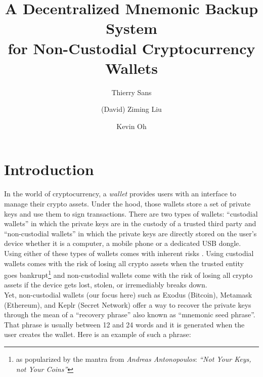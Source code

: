 \documentclass[runningheads]{llncs}
\begin{document}
\title{A Decentralized Mnemonic Backup System\\ for Non-Custodial Cryptocurrency Wallets}

\author{Thierry Sans \and
(David) Ziming Liu\and
Kevin Oh}


\maketitle             

\begin{abstract}



\end{abstract}

\section{Introduction}

In the world of cryptocurrency, a {\em wallet} provides users with an interface to manage their crypto assets. Under the hood, those wallets store a set of private keys and use them to sign transactions. There are two types of wallets: ``custodial wallets'' in which the private keys are in the custody of a trusted third party and ``non-custodial wallets'' in which the private keys are directly stored on the user's device whether it is a computer, a mobile phone or a dedicated USB dongle. Using either of these types of wallets comes with inherent risks \cite{azar2022financial}. Using custodial wallets comes with the risk of losing all crypto assets when the trusted entity goes bankrupt\footnote{as popularized by the mantra from {\em Andreas Antonopoulos}: {\em ``Not Your Keys, not Your Coins''}} and non-custodial wallets come with the risk of losing all crypto assets if the device gets lost, stolen, or irremediably breaks down. \\

Yet, non-custodial wallets (our focus here) such as Exodus (Bitcoin), Metamask (Ethereum), and Keplr (Secret Network) offer a way to recover the private keys through the mean of a ``recovery phrase'' also known as ``mnemonic seed phrase''. That phrase is usually between 12 and 24 words and it is generated when the user creates the wallet. Here is an example of such a phrase: 
\end{document}

